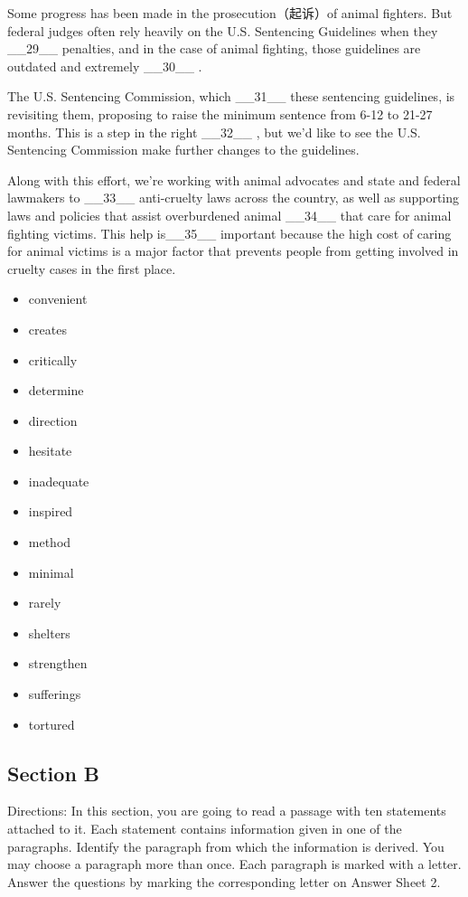 \documentclass[UTF8,11pt]{ctexart}
\begin{document}
Some progress has been made in the prosecution（起诉）of animal fighters. But federal judges often rely heavily on the U.S. Sentencing Guidelines when they \_\_29\_\_ penalties, and in the case of animal fighting, those guidelines are outdated and extremely \_\_30\_\_ .


The U.S. Sentencing Commission, which \_\_31\_\_ these sentencing guidelines, is revisiting them, proposing to raise the minimum sentence from 6-12 to 21-27 months. This is a step in the right \_\_32\_\_ , but we’d like to see the U.S. Sentencing Commission make further changes to the guidelines.


Along with this effort, we’re working with animal advocates and state and federal lawmakers to \_\_33\_\_ anti-cruelty laws across the country, as well as supporting laws and policies that assist overburdened animal \_\_34\_\_ that care for animal fighting victims. This help is\_\_35\_\_ important because the high cost of caring for animal victims is a major factor that prevents people from getting involved in cruelty cases in the first place.


\begin{itemize}[leftmargin=2em,itemsep=.2em,topsep=.4em]\item[A.] convenient
\item[B.] creates
\item[C.] critically
\item[D.] determine
\item[E.] direction
\item[F.] hesitate
\item[G.] inadequate
\item[H.] inspired
\item[I.] method
\item[J.] minimal
\item[K.] rarely
\item[L.] shelters
\item[M.] strengthen
\item[N.] sufferings
\item[O.] tortured
\end{itemize}

\subsection*{\textbf{Section B}}


Directions: In this section, you are going to read a passage with ten statements attached to it. Each statement contains information given in one of the paragraphs. Identify the paragraph from which the information is derived. You may choose a paragraph more than once. Each paragraph is marked with a letter. Answer the questions by marking the corresponding letter on Answer Sheet 2.
\end{document}
